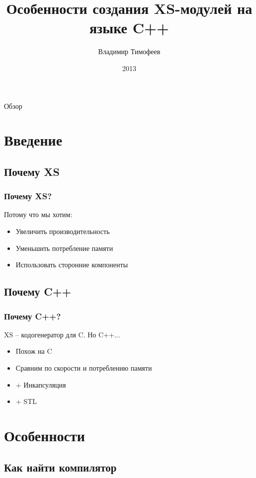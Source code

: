 \documentclass[utf8x]{beamer}
\title{Особенности создания XS-модулей на языке C++}
\author{Владимир Тимофеев}
\date{2013}
\begin{document}
\lstset{language=C}

\begin{frame}
    \titlepage
\end{frame}

\begin{frame}{Обзор}
    \tableofcontents
\end{frame}

\section{Введение}

\subsection{Почему XS}

\begin{frame}
    \frametitle{Почему XS?}
    Потому что мы хотим:
    \begin{itemize}[<+->]
        \item Увеличить производительность
        \item Уменьшить потребление памяти
        \item Использовать сторонние компоненты
    \end{itemize}
\end{frame}

\subsection{Почему C++}

\begin{frame}
    \frametitle{Почему C++?}
    XS -- кодогенератор для C. Но C++...
    \begin{itemize}[<+->]
        \item Похож на C
        \item Сравним по скорости и потреблению памяти
        \item + Инкапсуляция
        \item + STL
    \end{itemize}
\end{frame}

\section{Особенности}

\subsection{Как найти компилятор}
\end{document}
